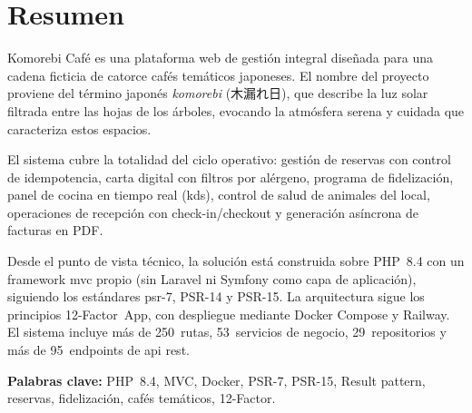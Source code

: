 \documentclass[12pt,a4paper,twoside,openright]{report}
\begin{document}

\pagestyle{plain}

\chapter*{Resumen}

Komorebi Café es una plataforma web de gestión integral diseñada para una cadena ficticia
de catorce cafés temáticos japoneses. El nombre del proyecto proviene del término japonés
\textit{komorebi} (木漏れ日), que describe la luz solar filtrada entre las hojas de los
árboles, evocando la atmósfera serena y cuidada que caracteriza estos espacios.

El sistema cubre la totalidad del ciclo operativo: gestión de reservas con control de
idempotencia, carta digital con filtros por alérgeno, programa de fidelización, panel de
cocina en tiempo real (\gls{kds}), control de salud de animales del local, operaciones de
recepción con check-in/checkout y generación asíncrona de facturas en PDF.

Desde el punto de vista técnico, la solución está construida sobre PHP~8.4 con un
framework \gls{mvc} propio (sin Laravel ni Symfony como capa de aplicación), siguiendo
los estándares \gls{psr}-7, PSR-14 y PSR-15. La arquitectura sigue los principios
12-Factor~App, con despliegue mediante Docker Compose y Railway. El sistema incluye
más de 250~rutas, 53~servicios de negocio, 29~repositorios y más de
95~endpoints de \gls{api} \gls{rest}.

\bigskip
\textbf{Palabras clave:} PHP~8.4, MVC, Docker, PSR-7, PSR-15, Result pattern,
reservas, fidelización, cafés temáticos, 12-Factor.

\vspace{2cm}
\end{document}
